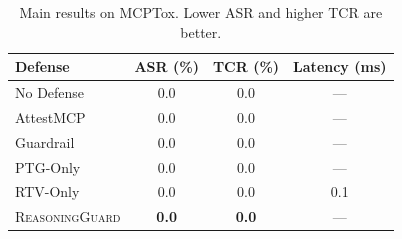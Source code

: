 \begin{table}[t]
\centering
\small
\begin{tabular}{lccc}
\toprule
Defense & ASR (\%) & TCR (\%) & Latency (ms) \\
\midrule
No Defense & 0.0 & 0.0 & --- \\
AttestMCP & 0.0 & 0.0 & --- \\
Guardrail & 0.0 & 0.0 & --- \\
PTG-Only & 0.0 & 0.0 & --- \\
RTV-Only & 0.0 & 0.0 & 0.1 \\
\textsc{ReasoningGuard} & \textbf{0.0} & \textbf{0.0} & --- \\
\bottomrule
\end{tabular}
\caption{Main results on MCPTox. Lower ASR and higher TCR are better.}
\label{tab:main}
\end{table}
